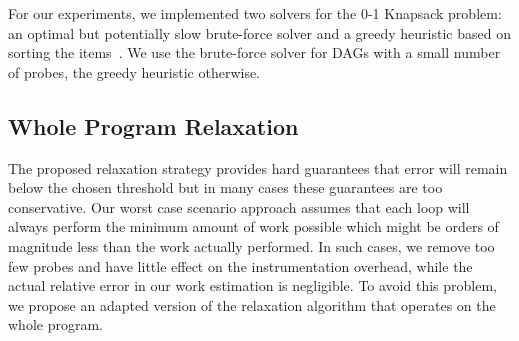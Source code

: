 



For our experiments, we implemented two solvers for the 0-1 Knapsack problem: an optimal but potentially slow brute-force solver and a
greedy heuristic based on sorting the items~\citep{dantzig57}. We use the brute-force solver for DAGs with a small number of probes, the
greedy heuristic otherwise. 

\subsection{Whole Program Relaxation}

The proposed relaxation strategy provides hard guarantees that error will remain below the chosen threshold but in many cases these
guarantees are too conservative. Our worst case scenario approach assumes that each loop will always perform the minimum amount of work
possible which might be orders of magnitude less than the work actually performed. In such cases, we remove too few probes and have little
effect on the instrumentation overhead, while the actual relative error in our work estimation is negligible. To avoid this problem, we
propose an adapted version of the relaxation algorithm that operates on the whole program. 

